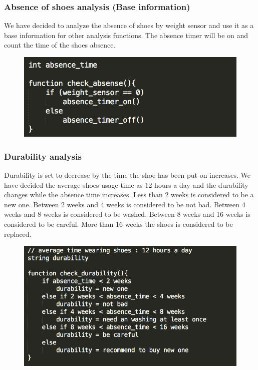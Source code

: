 \documentclass[conference]{IEEEtran}
\begin{document}
\subsubsection{Absence of shoes analysis (Base information)}
We have decided to analyze the absence of shoes by weight sensor and use it as a base information for other analysis functions. The absence timer will be on and count the time of the shoes absence.
\begin{figure}[htbp]
\begin{center}
    \includegraphics[scale=0.6]{analysis1}
    \label{fig:label}
\end{center}
\end{figure}
\subsubsection{Durability analysis}
Durability is set to decrease by the time the shoe has been put on increases. We have decided the average shoes usage time as 12 hours a day and the durability changes while the absence time increases. Less than 2 weeks is considered to be a new one. Between 2 weeks and 4 weeks is considered to be not bad. 
Between 4 weeks and 8 weeks is considered to be washed. Between 8 weeks and 16 weeks is considered to be careful. More than 16 weeks the shoes is considered to be replaced.
\begin{figure}[htbp]
\begin{center}
    \includegraphics[scale=0.58]{analysis2}
    \label{fig:label}
\end{center}
\end{figure}
\end{document}
